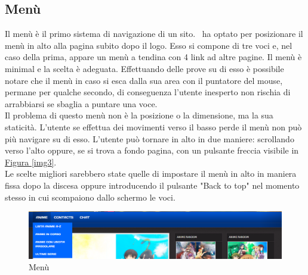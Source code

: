 \subsection{Menù} \label{Menù}
Il menù è il primo sistema di navigazione di un sito. \nomeSito\ ha optato per posizionare il menù in alto alla pagina subito dopo il logo. Esso si compone di tre voci e, nel caso della prima, appare un menù a tendina con 4 link ad altre pagine. Il menù è minimal e la scelta è adeguata. Effettuando delle prove su di esso è possibile notare che il menù in caso si esca dalla sua area con il puntatore del mouse, permane per qualche secondo, di conseguenza l'utente inesperto non rischia di arrabbiarsi se sbaglia a puntare una voce. \\
Il problema di questo menù non è la posizione o la dimensione, ma la sua staticità. L'utente se effettua dei movimenti verso il basso perde il menù non può più navigare su di esso. L'utente può tornare in alto in due maniere: scrollando verso l'alto oppure, se si trova a fondo pagina, con un pulsante freccia visibile in \hyperref[img3]{Figura \ref{img3}}.\\
Le scelte migliori sarebbero state quelle di impostare il menù in alto in maniera fissa dopo la discesa oppure introducendo il pulsante "Back to top" nel momento stesso in cui scompaiono dallo schermo le voci.

\begin{figure}[H]
	\includegraphics[width=1\textwidth]{img/menu.png}
	\caption{Menù} 
	\label{img4} 
\end{figure}